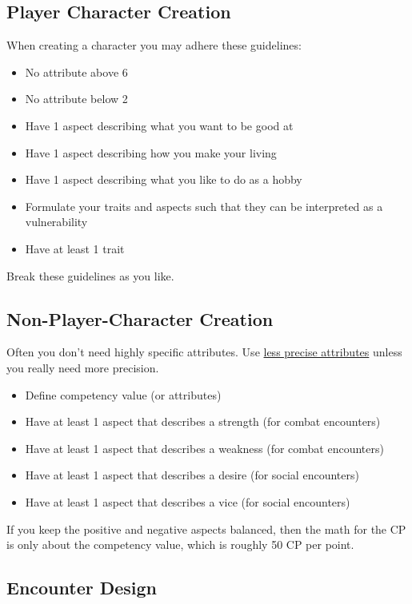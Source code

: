 \documentclass[11pt]{article}
\begin{document}
{\subsection{Player Character Creation}
\label{sec:org4da854c}

When creating a character you may adhere these guidelines:
\begin{itemize}
\item No attribute above 6
\item No attribute below 2
\item Have 1 aspect describing what you want to be good at
\item Have 1 aspect describing how you make your living
\item Have 1 aspect describing what you like to do as a hobby
\item Formulate your traits and aspects such that they can be interpreted as a vulnerability
\item Have at least 1 trait
\end{itemize}
Break these guidelines as you like.
\subsection{Non-Player-Character Creation}
\label{sec:org130ca54}

Often you don't need highly specific attributes. Use \hyperref[sec:org7891400]{less precise attributes} unless you really need more precision.
\begin{itemize}
\item Define competency value (or attributes)
\item Have at least 1 aspect that describes a strength (for combat encounters)
\item Have at least 1 aspect that describes a weakness (for combat encounters)
\item Have at least 1 aspect that describes a desire (for social encounters)
\item Have at least 1 aspect that describes a vice (for social encounters)
\end{itemize}
If you keep the positive and negative aspects balanced, then the math for the CP is only about the competency value, which is roughly 50 CP per point.
\subsection{Encounter Design}
\label{sec:org4487be2}

}
\end{document}
